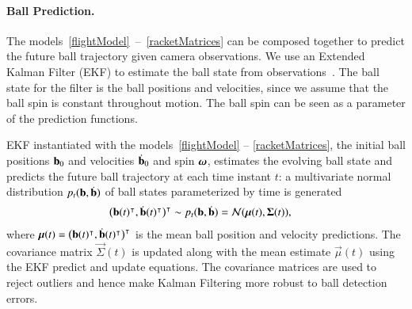 \paragraph{Ball Prediction.} The models~\mbox{\eqref{flightModel} -- \eqref{racketMatrices}} can be composed together to predict the future ball trajectory given camera observations. We use an Extended Kalman Filter (EKF) to estimate the ball state from observations~\citep{Sorenson85}. The ball state for the filter is the ball positions and velocities, since we assume that the ball spin is constant throughout motion. The ball spin can be seen as a parameter of the prediction functions. 

EKF instantiated with the models~\eqref{flightModel} -- \eqref{racketMatrices}, the initial ball positions $\boldsymbol{\mathrm{b}}_0$ and velocities $\dot{\boldsymbol{\mathrm{b}}}_0$ and spin $\boldsymbol{\mathrm{\omega}}$, estimates the evolving ball state and predicts the future ball trajectory at each time instant $t$: a multivariate normal distribution $p_t(\boldsymbol{\mathrm{b}},\dot{\boldsymbol{\mathrm{b}}})$ of ball states parameterized by time is generated
%
\begin{align}
\big(\boldsymbol{\mathrm{b}}(t)^{\intercal},\dot{\boldsymbol{\mathrm{b}}}(t)^{\intercal}\big)^{\intercal} &\sim p_t(\boldsymbol{\mathrm{b}},\dot{\boldsymbol{\mathrm{b}}}) = \mathcal{N}(\boldsymbol{\mathrm{\mu}}(t),\boldsymbol{\mathrm{\Sigma}}(t)),
\end{align}
%
\noindent where $\boldsymbol{\mathrm{\mu}}(t) = \big(\boldsymbol{\mathrm{b}}(t)^{\intercal},\dot{\boldsymbol{\mathrm{b}}}(t)^{\intercal}\big)^{\intercal}$ is the mean ball position and velocity predictions. The covariance matrix $\vec{\Sigma}(t)$ is updated along with the mean estimate $\vec{\mu}(t)$ using the EKF predict and update equations. The covariance matrices are used to reject outliers and hence make Kalman Filtering more robust to ball detection errors.
